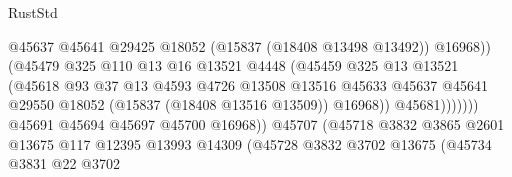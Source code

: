 \begin{lexlean}{RustStd}
\begin{coremodule}
{\begin{coremodule}
{{{{{{{{{{{{{{{{{{{{{{{{{{{{{{{{{{{{{{{{{{{{{{{{{{{{{{{{{{{{                                              @45637
                                              @45641
                                              @29425
                                              @18052
                                              (@15837 (@18408 @13498 @13492))
                                              @16968))
                                          (@45479
                                            @325
                                            @110
                                            @13
                                            @16
                                            @13521
                                            @4448
                                            (@45459
                                              @325
                                              @13
                                              @13521
                                              (@45618
                                                @93
                                                @37
                                                @13
                                                @4593
                                                @4726
                                                @13508
                                                @13516
                                                @45633
                                                @45637
                                                @45641
                                                @29550
                                                @18052
                                                (@15837 (@18408 @13516 @13509))
                                                @16968))
                                            @45681)))))))
                              @45691
                              @45694
                              @45697
                              @45700
                              @16968))
                          @45707
                          (@45718
                            @3832
                            @3865
                            @2601
                            @13675
                            @117
                            @12395
                            @13993
                            @14309
                            (@45728
                              @3832
                              @3702
                              @13675
                              (@45734
                                @3831
                                @22
                                @3702
}}}}}}}}}}}}}}}}}}}}}}}}}}}}}}}}}}}}}}}}}}}}}}}}}}}}}}}}}}}}
\end{coremodule}}
\end{coremodule}
\end{lexlean}
